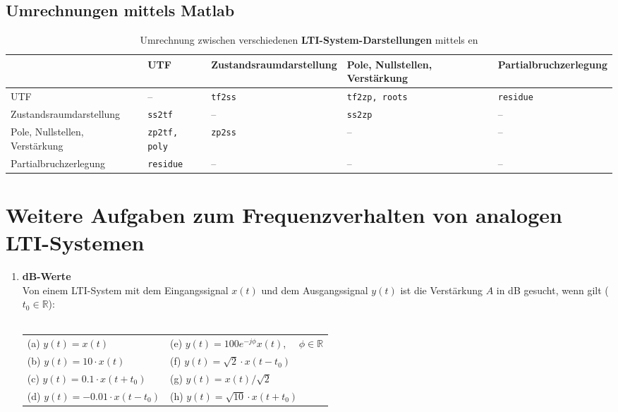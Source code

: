 {\begin{table}[htb]
\begin{center}
{}
\end{center}
\end{table}
\vspace*{-2mm}
\subsection{Umrechnungen mittels {\sc\bf Matlab}}
\vspace*{-5mm}
\begin{table}[htb]
\begin{tabular}{|p{3cm}||p{2.5cm}|p{2.5cm}|p{2.5cm}|p{2.5cm}|}\hline

 & UTF & Zustands\-raum\-darstellung & Pole, Nullstellen, Verst\"arkung & Partial\-bruch\-zerlegung  \\ \hline\hline
UTF & --  & {\tt tf2ss} & {\tt tf2zp, roots} & {\tt residue}  \\ \hline
Zustands\-raum\-darstellung & {\tt ss2tf}  & -- & {\tt ss2zp} & -- \\ \hline
Pole, Nullstellen, Verst\"arkung & {\tt zp2tf, poly} & {\tt zp2ss}&-- &--  \\ \hline
 Partial\-bruch\-zerlegung & {\tt residue}  & -- & -- & -- \\ \hline
\end{tabular}\vspace*{-3mm}\caption{Umrechnung zwischen verschiedenen {\bf LTI-System-Darstellungen} mittels \mb\!\!en}

\end{table}

\newpage
\section{Weitere Aufgaben zum Frequenzverhalten von analogen LTI-Systemen}
\begin{enumerate}
\item{\bf dB-Werte}\\
Von einem LTI-System mit dem Eingangssignal $x(t)$ und dem Ausgangssignal $y(t)$ ist die Verst\"arkung $A$ in dB gesucht, wenn gilt ($t_0\in\mathbb{R}$):\\~\\
\begin{tabular}{l l}
 (a) $y(t)= x(t)$ & (e) $y(t)=100e^{-j\phi} x(t)$, ~~$\phi\in\mathbb{R}$\\
 (b) $y(t)=10\cdot x(t)$ & (f) $y(t)=\sqrt{2}\cdot x(t-t_0)$\\
 (c) $y(t)=0.1\cdot x(t+t_0)$ & (g) $y(t)=x(t)/\sqrt{2}$\\
 (d) $y(t)=-0.01\cdot x(t-t_0)$  & (h) $y(t)=\sqrt{10}\cdot x(t+t_0)$  \\
\end{tabular}


\end{enumerate}}
